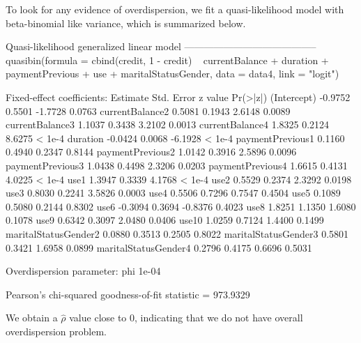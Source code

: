 \documentclass{article}
\begin{document}
To look for any evidence of overdispersion, we fit a quasi-likelihood model with beta-binomial like variance, which is summarized below.
\begin{Schunk}
\begin{Soutput}
Quasi-likelihood generalized linear model
-----------------------------------------
quasibin(formula = cbind(credit, 1 - credit) ~ currentBalance + 
    duration + paymentPrevious + use + maritalStatusGender, data = data4, 
    link = "logit")

Fixed-effect coefficients:
                     Estimate Std. Error z value Pr(>|z|)
(Intercept)           -0.9752     0.5501 -1.7728   0.0763
currentBalance2        0.5081     0.1943  2.6148   0.0089
currentBalance3        1.1037     0.3438  3.2102   0.0013
currentBalance4        1.8325     0.2124  8.6275   < 1e-4
duration              -0.0424     0.0068 -6.1928   < 1e-4
paymentPrevious1       0.1160     0.4940  0.2347   0.8144
paymentPrevious2       1.0142     0.3916  2.5896   0.0096
paymentPrevious3       1.0438     0.4498  2.3206   0.0203
paymentPrevious4       1.6615     0.4131  4.0225   < 1e-4
use1                   1.3947     0.3339  4.1768   < 1e-4
use2                   0.5529     0.2374  2.3292   0.0198
use3                   0.8030     0.2241  3.5826   0.0003
use4                   0.5506     0.7296  0.7547   0.4504
use5                   0.1089     0.5080  0.2144   0.8302
use6                  -0.3094     0.3694 -0.8376   0.4023
use8                   1.8251     1.1350  1.6080   0.1078
use9                   0.6342     0.3097  2.0480   0.0406
use10                  1.0259     0.7124  1.4400   0.1499
maritalStatusGender2   0.0880     0.3513  0.2505   0.8022
maritalStatusGender3   0.5801     0.3421  1.6958   0.0899
maritalStatusGender4   0.2796     0.4175  0.6696   0.5031

Overdispersion parameter:
  phi 
1e-04 

Pearson's chi-squared goodness-of-fit statistic = 973.9329 
\end{Soutput}
\end{Schunk}
We obtain a $\hat{\rho}$ value close to 0, indicating that we do not have overall overdispersion problem.
\end{document}
